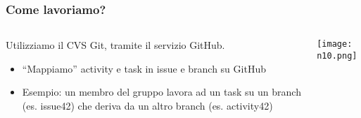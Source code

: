 \begin{frame}
\frametitle{Come lavoriamo?}
\begin{columns}
    \begin{column}{0.4\textwidth}
     \par
	Utilizziamo il CVS Git, tramite il servizio GitHub.\\
	\begin{itemize}
		\item ``Mappiamo'' activity e task in issue e branch su GitHub
		\item Esempio: un membro del gruppo lavora ad un task su un branch (es. issue42) che deriva da un altro branch (es. activity42)
	\end{itemize}
    \end{column}
    \begin{column}{0.4\textwidth}
     \texttt{[image: n10.png]}
    \end{column}
  \end{columns}
\end{frame}


